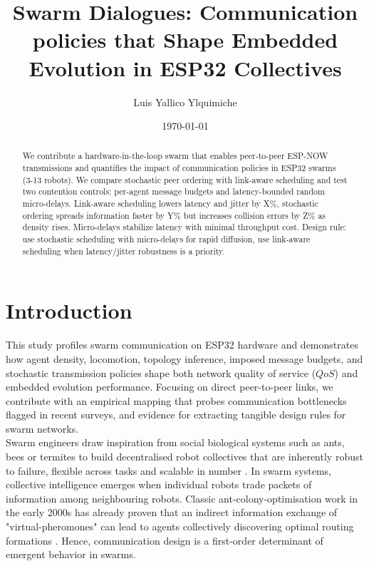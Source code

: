 \documentclass[conference]{IEEEtran}
\title{Swarm Dialogues: Communication policies that Shape Embedded Evolution in ESP32 Collectives}
\author{Luis Yallico Ylquimiche}
\date{\today}
\begin{document}
\maketitle
\pagestyle{plain}

\begin{abstract}
We contribute a hardware-in-the-loop swarm that enables peer-to-peer ESP-NOW transmissions and quantifies the impact of communication policies in ESP32 swarms (3-13 robots). We compare stochastic peer ordering with link-aware scheduling and test two contention controls: per-agent message budgets and latency-bounded random micro-delays. Link-aware scheduling lowers latency and jitter by X\%, stochastic ordering spreads information faster by Y\% but increases collision errors by Z\% as density rises. Micro-delays stabilize latency with minimal throughput cost. Design rule: use stochastic scheduling with micro-delays for rapid diffusion, use link-aware scheduling when latency/jitter robustness is a priority.
\end{abstract}


\section{Introduction}

This study profiles swarm communication on ESP32 hardware and demonstrates how agent density, locomotion, topology inference, imposed message budgets, and stochastic transmission policies shape both network quality of service ($QoS$) and embedded evolution performance. Focusing on direct peer-to-peer links, we contribute with an empirical mapping that probes communication bottlenecks flagged in recent surveys, and evidence for extracting tangible design rules for swarm networks. \\

Swarm engineers draw inspiration from social biological systems such as ants, bees or termites to build decentralised robot collectives that are inherently robust to failure, flexible across tasks and scalable in number \cite{hamann_swarm_2018}. In swarm systems, collective intelligence emerges when individual robots trade packets of information among neighbouring robots. Classic ant-colony-optimisation work in the early 2000s has already proven that an indirect information exchange of "virtual-pheromones" can lead to agents collectively discovering optimal routing formations \cite{dorigo_ant_2000}. Hence, communication design is a first-order determinant of emergent behavior in swarms. \\
\end{document}
